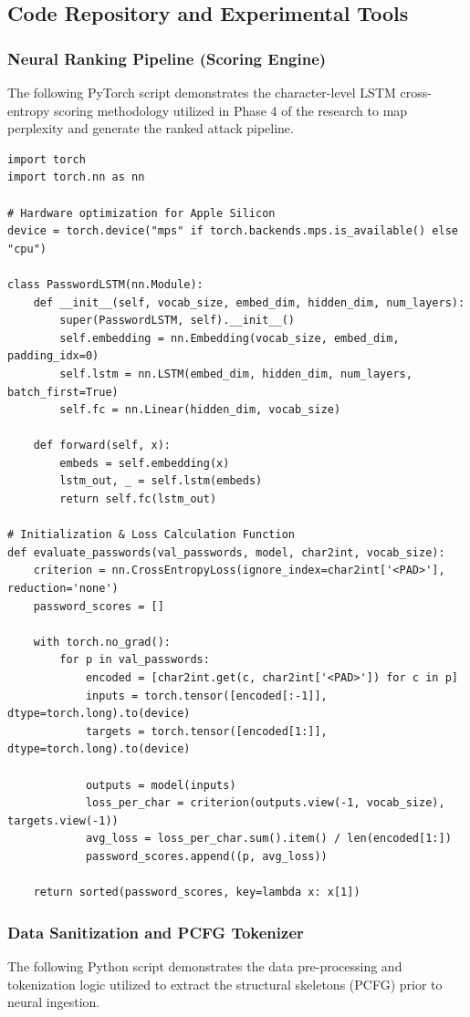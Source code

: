 \documentclass[conference]{IEEEtran}
\begin{document}
\subsection{Code Repository and Experimental Tools}
\subsubsection{Neural Ranking Pipeline (Scoring Engine)}
The following PyTorch script demonstrates the character-level LSTM cross-entropy scoring methodology utilized in Phase 4 of the research to map perplexity and generate the ranked attack pipeline.

\begin{lstlisting}
import torch
import torch.nn as nn

# Hardware optimization for Apple Silicon
device = torch.device("mps" if torch.backends.mps.is_available() else "cpu")

class PasswordLSTM(nn.Module):
    def __init__(self, vocab_size, embed_dim, hidden_dim, num_layers):
        super(PasswordLSTM, self).__init__()
        self.embedding = nn.Embedding(vocab_size, embed_dim, padding_idx=0)
        self.lstm = nn.LSTM(embed_dim, hidden_dim, num_layers, batch_first=True)
        self.fc = nn.Linear(hidden_dim, vocab_size)
        
    def forward(self, x):
        embeds = self.embedding(x)
        lstm_out, _ = self.lstm(embeds)
        return self.fc(lstm_out)

# Initialization & Loss Calculation Function
def evaluate_passwords(val_passwords, model, char2int, vocab_size):
    criterion = nn.CrossEntropyLoss(ignore_index=char2int['<PAD>'], reduction='none')
    password_scores = []
    
    with torch.no_grad():
        for p in val_passwords:
            encoded = [char2int.get(c, char2int['<PAD>']) for c in p]
            inputs = torch.tensor([encoded[:-1]], dtype=torch.long).to(device)
            targets = torch.tensor([encoded[1:]], dtype=torch.long).to(device)
            
            outputs = model(inputs)
            loss_per_char = criterion(outputs.view(-1, vocab_size), targets.view(-1))
            avg_loss = loss_per_char.sum().item() / len(encoded[1:])
            password_scores.append((p, avg_loss))
            
    return sorted(password_scores, key=lambda x: x[1])
\end{lstlisting}

\subsubsection{Data Sanitization and PCFG Tokenizer}
The following Python script demonstrates the data pre-processing and tokenization logic utilized to extract the structural skeletons (PCFG) prior to neural ingestion. 
\end{document}
